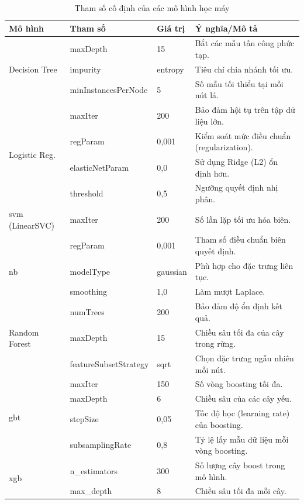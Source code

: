 \begin{table}[htbp]
\centering
\caption{Tham số cố định của các mô hình học máy}
\label{tab:model_parameters}
\small
\renewcommand{\arraystretch}{0.9}
\small
\begin{tabular*}{\textwidth}{@{\extracolsep{\fill}}llp{2.2cm}p{5.6cm}@{}}
\toprule
\textbf{Mô hình} & \textbf{Tham số} & \textbf{Giá trị} & \textbf{Ý nghĩa/Mô tả} \\
\midrule
\multirow{3}{*}{Decision Tree}
& maxDepth & 15 & Bắt các mẫu tấn công phức tạp. \\
& impurity & entropy & Tiêu chí chia nhánh tối ưu. \\
& minInstancesPerNode & 5 & Số mẫu tối thiểu tại mỗi nút lá. \\
\midrule
\multirow{4}{*}{Logistic Reg.} & maxIter & 200 & Bảo đảm hội tụ trên tập dữ liệu lớn. \\
& regParam & 0{,}001 & Kiểm soát mức điều chuẩn (regularization). \\
& elasticNetParam & 0{,}0 & Sử dụng Ridge (L2) ổn định hơn. \\
& threshold & 0{,}5 & Ngưỡng quyết định nhị phân. \\
\midrule
\ac{svm} (LinearSVC) & maxIter & 200 & Số lần lặp tối ưu hóa biên. \\
& regParam & 0{,}001 & Tham số điều chuẩn biên quyết định. \\
\midrule
\ac{nb} & modelType & gaussian & Phù hợp cho đặc trưng liên tục. \\
& smoothing & 1{,}0 & Làm mượt Laplace. \\
\midrule
\multirow{3}{*}{Random Forest} 
& numTrees & 200 & Bảo đảm độ ổn định kết quả. \\
& maxDepth & 15 & Chiều sâu tối đa của cây trong rừng. \\
& featureSubsetStrategy & sqrt & Chọn đặc trưng ngẫu nhiên mỗi nút. \\
\midrule
\multirow{4}{*}{\ac{gbt}}
& maxIter & 150 & Số vòng boosting tối đa. \\
& maxDepth & 6 & Chiều sâu của các cây yếu. \\
& stepSize & 0{,}05 & Tốc độ học (learning rate) của boosting. \\
& subsamplingRate & 0{,}8 & Tỷ lệ lấy mẫu dữ liệu mỗi vòng boosting. \\
\midrule
\multirow{5}{*}{\ac{xgb}}
& n\_estimators & 300 & Số lượng cây boost trong mô hình. \\
& max\_depth & 8 & Chiều sâu tối đa mỗi cây. \\

\end{tabular*}
\end{table}
